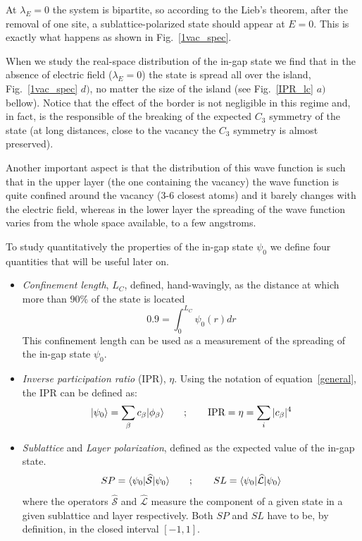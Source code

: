 At $\lambda_E=0$ the system is bipartite, so according to the Lieb's theorem, after the removal of one site, a sublattice-polarized state should appear at $E=0$. This is exactly what happens as shown in Fig.~\ref{1vac_spec}.

When we study the real-space distribution of the in-gap state we find that in the absence of electric field ($\lambda_E=0$) the state is spread all over the island, Fig.~\ref{1vac_spec} $d)$, no matter the size of the island (see Fig.~\ref{IPR_lc} $a)$ bellow). Notice that the effect of the border is not negligible in this regime and, in fact, is the responsible of the breaking of the expected $C_3$ symmetry of the state (at long distances, close to the vacancy the $C_3$ symmetry is almost preserved).


Another important aspect is that the distribution of this wave function is such that in the upper layer (the one containing the vacancy) the wave function is quite confined around the vacancy (3-6 closest atoms) and it barely changes with the electric field, whereas in the lower layer the spreading of the wave function varies from the whole space available, to a few angstroms.


To study quantitatively the properties of the in-gap state $\psi_0$ we define four quantities that will be useful later on.
\begin{itemize}
  \item \emph{Confinement length}, $L_C$, defined, hand-wavingly, as the distance at which more than $90\%$ of the state is located
  \begin{equation}
    0.9 = \int_{0}^{L_C} \psi_0(r) dr   %
    \label{loclen}
  \end{equation}
  This confinement length can be used as a measurement of the spreading of the in-gap state $\psi_0$.
  \item \emph{Inverse participation ratio} (IPR), $\eta$. Using the notation of equation~\eqref{general}, the IPR can be defined as:
  \begin{equation}
    |\psi_0\rangle = \sum_\beta c_\beta|\phi_\beta\rangle\quad\quad;\quad\quad
    \text{IPR} = \eta = \sum_i |c_\beta|^4
  \end{equation}
  \item \emph{Sublattice} and \emph{Layer polarization}, defined as the expected value of the in-gap state.
  \begin{equation}
    SP = \langle\psi_0|\widehat{\mathcal{S}}|\psi_0\rangle
    \quad\quad;\quad\quad
    SL = \langle\psi_0|\widehat{\mathcal{L}}|\psi_0\rangle
  \end{equation}
  where the operators $\widehat{\mathcal{S}}$ and $\widehat{\mathcal{L}}$ measure the component of a given state in a given sublattice and layer respectively. Both $SP$ and $SL$ have to be, by definition, in the closed interval $\left[-1,1\right]$.
\end{itemize}

